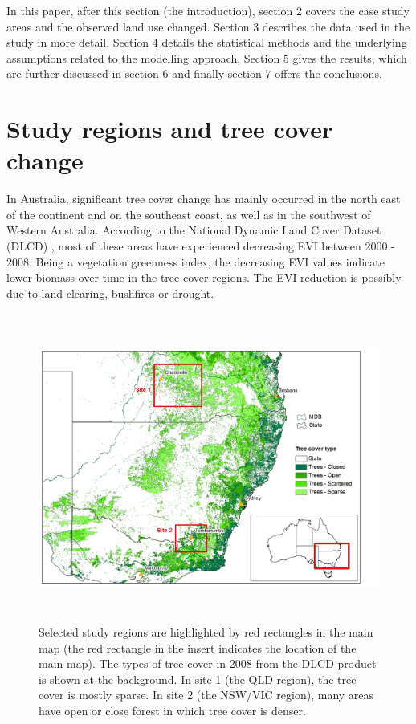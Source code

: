 \documentclass[draft,linenumbers]{agujournal}
\begin{document}
In this paper, after this section (the introduction), section 2 covers the case study areas and the observed land use changed. Section 3 describes the data used in the study in more detail. Section 4 details the statistical methods and the underlying assumptions related to the modelling approach, Section 5 gives the results, which are further discussed in section 6 and finally section 7 offers the conclusions.  

\section{Study regions and tree cover change}

In Australia, significant tree cover change has mainly occurred in the north east of the continent and on the southeast coast, as well as in the southwest of Western Australia. According to the National Dynamic Land Cover Dataset (DLCD) \citep{Lymburner2010}, most of these areas have experienced decreasing EVI between 2000 - 2008. Being a vegetation greenness index, the decreasing EVI values indicate lower biomass over time in the tree cover regions. The EVI reduction is possibly due to land clearing, bushfires or drought. 

\begin{figure}[ht!]
  \centerline{\includegraphics[height = 4in,scale=0.5]{map_selreg.jpg}}
  \caption{Selected study regions are highlighted by red rectangles in the main map (the red rectangle in the insert indicates the location of the main map). The types of tree cover in 2008 from the DLCD product is shown at the background. In site 1 (the QLD region), the tree cover is mostly sparse. In site 2 (the NSW/VIC region), many areas have open or close forest in which tree cover is denser.}
  \label{fig:sel_reg}
\end{figure}
\end{document}
